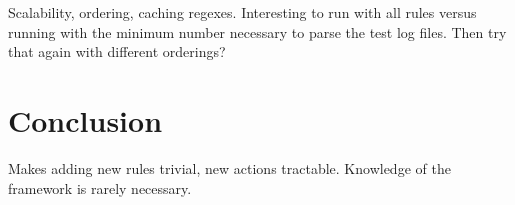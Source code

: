 \documentclass[twocolumn,a4paper,11pt,draft]{article}
\begin{document}
Scalability, ordering, caching regexes.  Interesting to run with all rules
versus running with the minimum number necessary to parse the test log
files.  Then try that again with different orderings?

\section{Conclusion}

Makes adding new rules trivial, new actions tractable.  Knowledge of the
framework is rarely necessary.

\appendix

\cite{postfix}



\label{bibliography}
\end{document}
